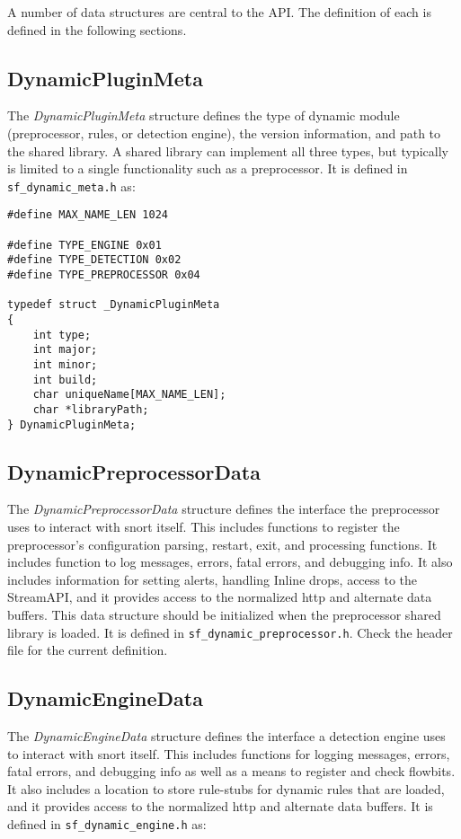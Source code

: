 \documentclass[english]{report}
\begin{document}
A number of data structures are central to the API.  The definition of each is
defined in the following sections.

\subsection{DynamicPluginMeta}

The {\em DynamicPluginMeta} structure defines the type of dynamic module
(preprocessor, rules, or detection engine), the version information, and path
to the shared library.  A shared library can implement all three types, but
typically is limited to a single functionality such as a preprocessor.  It is
defined in \texttt{sf\_dynamic\_meta.h} as:

\begin{verbatim}
#define MAX_NAME_LEN 1024

#define TYPE_ENGINE 0x01
#define TYPE_DETECTION 0x02
#define TYPE_PREPROCESSOR 0x04

typedef struct _DynamicPluginMeta
{
    int type;
    int major;
    int minor;
    int build;
    char uniqueName[MAX_NAME_LEN];
    char *libraryPath;
} DynamicPluginMeta;
\end{verbatim}

\subsection{DynamicPreprocessorData}

The {\em DynamicPreprocessorData} structure defines the interface the
preprocessor uses to interact with snort itself.  This includes functions to
register the preprocessor's configuration parsing, restart, exit, and
processing functions.  It includes function to log messages, errors, fatal
errors, and debugging info.  It also includes information for setting alerts,
handling Inline drops, access to the StreamAPI, and it provides access to the
normalized http and alternate data buffers.  This data structure should be
initialized when the preprocessor shared library is loaded.  It is defined in
\texttt{sf\_dynamic\_preprocessor.h}.  Check the header file for the current
definition.

\subsection{DynamicEngineData}

The {\em DynamicEngineData} structure defines the interface a detection engine
uses to interact with snort itself.  This includes functions for logging
messages, errors, fatal errors, and debugging info as well as a means to
register and check flowbits.  It also includes a location to store rule-stubs
for dynamic rules that are loaded, and it provides access to the normalized
http and alternate data buffers.  It is defined in
\texttt{sf\_dynamic\_engine.h} as:
\end{document}
